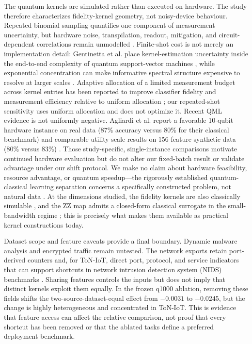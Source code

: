 \documentclass[referee,lineno,pdflatex,sn-vancouver-num]{sn-jnl}
\theoremstyle{thmstyleone}%
\theoremstyle{thmstyletwo}%
\theoremstyle{thmstylethree}%
\begin{document}
The quantum kernels are simulated rather than executed on hardware. The study therefore characterizes fidelity-kernel geometry, not noisy-device behaviour. Repeated binomial sampling quantifies one component of measurement uncertainty, but hardware noise, transpilation, readout, mitigation, and circuit-dependent correlations remain unmodelled \cite{wang2021nisq}. Finite-shot cost is not merely an implementation detail: Gentinetta et al. place kernel-estimation uncertainty inside the end-to-end complexity of quantum support-vector machines \cite{gentinetta2024complexity}, while exponential concentration can make informative spectral structure expensive to resolve at larger scales \cite{thanasilp2024concentration}. Adaptive allocation of a limited measurement budget across kernel entries has been reported to improve classifier fidelity and measurement efficiency relative to uniform allocation \cite{miroszewski2026adaptive}; our repeated-shot sensitivity uses uniform allocation and does not optimize it. Recent QML evidence is not uniformly negative. Agliardi et al. report a favorable 10-qubit hardware instance on real data (87\% accuracy versus 80\% for their classical benchmark) and comparable utility-scale results on 156-feature synthetic data (80\% versus 83\%) \cite{agliardi2026covariant}. Those study-specific, single-instance comparisons motivate continued hardware evaluation but do not alter our fixed-batch result or validate advantage under our shift protocol. We make no claim about hardware feasibility, resource advantage, or quantum speedup---the rigorously established quantum-classical learning separation concerns a specifically constructed problem, not natural data \cite{liu2021rigorous}. At the dimensions studied, the fidelity kernels are also classically simulable \cite{schreiber2023surrogates,jerbi2024shadows}, and the ZZ map admits a closed-form classical surrogate in the small-bandwidth regime \cite{tekeli2026zzsurrogate}; this is precisely what makes them available as practical kernel constructions today.

Dataset scope and feature caveats provide a final boundary. Dynamic malware analysis and encrypted traffic remain untested. The network exports retain port-derived counters and, for ToN-IoT, direct port, protocol, and service indicators that can support shortcuts in network intrusion detection system (NIDS) benchmarks \cite{engelen2021troubleshooting}. Sharing features controls the inputs but does not imply that distinct kernels exploit them equally. In the frozen q1000 ablation, removing these fields shifts the two-source-dataset-equal effect from $-0.0031$ to $-0.0245$, but the change is highly heterogeneous and concentrated in ToN-IoT. This is evidence that feature access can affect the relative comparison, not proof that every shortcut has been removed or that the ablated tasks define a preferred deployment benchmark.
\end{document}
